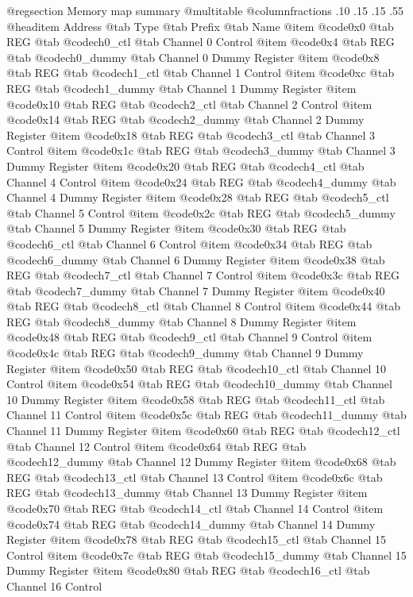 @regsection Memory map summary
@multitable  @columnfractions .10 .15 .15 .55
@headitem Address @tab Type @tab Prefix @tab Name
@item @code{0x0} @tab
REG @tab
@code{ch0_ctl} @tab
Channel 0 Control
@item @code{0x4} @tab
REG @tab
@code{ch0_dummy} @tab
Channel 0 Dummy Register
@item @code{0x8} @tab
REG @tab
@code{ch1_ctl} @tab
Channel 1 Control
@item @code{0xc} @tab
REG @tab
@code{ch1_dummy} @tab
Channel 1 Dummy Register
@item @code{0x10} @tab
REG @tab
@code{ch2_ctl} @tab
Channel 2 Control
@item @code{0x14} @tab
REG @tab
@code{ch2_dummy} @tab
Channel 2 Dummy Register
@item @code{0x18} @tab
REG @tab
@code{ch3_ctl} @tab
Channel 3 Control
@item @code{0x1c} @tab
REG @tab
@code{ch3_dummy} @tab
Channel 3 Dummy Register
@item @code{0x20} @tab
REG @tab
@code{ch4_ctl} @tab
Channel 4 Control
@item @code{0x24} @tab
REG @tab
@code{ch4_dummy} @tab
Channel 4 Dummy Register
@item @code{0x28} @tab
REG @tab
@code{ch5_ctl} @tab
Channel 5 Control
@item @code{0x2c} @tab
REG @tab
@code{ch5_dummy} @tab
Channel 5 Dummy Register
@item @code{0x30} @tab
REG @tab
@code{ch6_ctl} @tab
Channel 6 Control
@item @code{0x34} @tab
REG @tab
@code{ch6_dummy} @tab
Channel 6 Dummy Register
@item @code{0x38} @tab
REG @tab
@code{ch7_ctl} @tab
Channel 7 Control
@item @code{0x3c} @tab
REG @tab
@code{ch7_dummy} @tab
Channel 7 Dummy Register
@item @code{0x40} @tab
REG @tab
@code{ch8_ctl} @tab
Channel 8 Control
@item @code{0x44} @tab
REG @tab
@code{ch8_dummy} @tab
Channel 8 Dummy Register
@item @code{0x48} @tab
REG @tab
@code{ch9_ctl} @tab
Channel 9 Control
@item @code{0x4c} @tab
REG @tab
@code{ch9_dummy} @tab
Channel 9 Dummy Register
@item @code{0x50} @tab
REG @tab
@code{ch10_ctl} @tab
Channel 10 Control
@item @code{0x54} @tab
REG @tab
@code{ch10_dummy} @tab
Channel 10 Dummy Register
@item @code{0x58} @tab
REG @tab
@code{ch11_ctl} @tab
Channel 11 Control
@item @code{0x5c} @tab
REG @tab
@code{ch11_dummy} @tab
Channel 11 Dummy Register
@item @code{0x60} @tab
REG @tab
@code{ch12_ctl} @tab
Channel 12 Control
@item @code{0x64} @tab
REG @tab
@code{ch12_dummy} @tab
Channel 12 Dummy Register
@item @code{0x68} @tab
REG @tab
@code{ch13_ctl} @tab
Channel 13 Control
@item @code{0x6c} @tab
REG @tab
@code{ch13_dummy} @tab
Channel 13 Dummy Register
@item @code{0x70} @tab
REG @tab
@code{ch14_ctl} @tab
Channel 14 Control
@item @code{0x74} @tab
REG @tab
@code{ch14_dummy} @tab
Channel 14 Dummy Register
@item @code{0x78} @tab
REG @tab
@code{ch15_ctl} @tab
Channel 15 Control
@item @code{0x7c} @tab
REG @tab
@code{ch15_dummy} @tab
Channel 15 Dummy Register
@item @code{0x80} @tab
REG @tab
@code{ch16_ctl} @tab
Channel 16 Control
